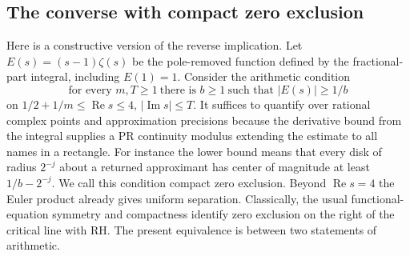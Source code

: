 \subsection{The converse with compact zero exclusion}\label{sec:compact-rh}

Here is a constructive version of the reverse implication. Let
$E(s)=(s-1)\zeta(s)$ be the pole-removed function defined by the
fractional-part integral, including $E(1)=1$. Consider the arithmetic
condition
\[
 \text{for every } m,T\ge1\ \text{there is } b\ge1\ \text{such that }
       |E(s)|\ge 1/b
\]
on $1/2+1/m\le\operatorname{Re}s\le4$, $|\operatorname{Im}s|\le T$.
It suffices to quantify over rational complex points and approximation
precisions because the derivative bound from the integral supplies a PR
continuity modulus extending the estimate to all names in a rectangle.
For instance the lower bound means that every disk of radius
$2^{-j}$ about a returned approximant has center of magnitude
at least $1/b-2^{-j}$. We call this condition compact zero exclusion.
Beyond $\operatorname{Re}s=4$ the Euler product already gives uniform
separation. Classically, the usual functional-equation symmetry and
compactness identify zero exclusion on the right of the critical line
with RH. The present equivalence is between two statements of arithmetic.

